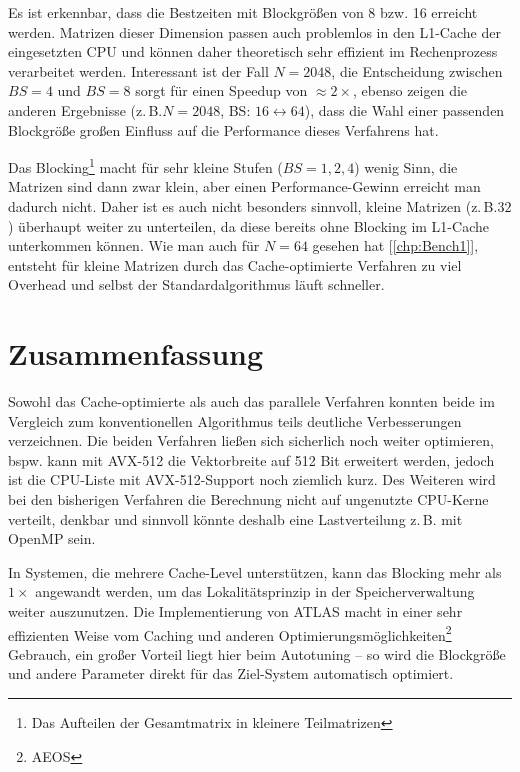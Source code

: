 \documentclass[a4paper,11pt]{scrartcl}
\newcommand{\zB}{\mbox{z.\,B.}\xspace}
\newcommand{\bspw}{\mbox{bspw.}\xspace}
\newcommand{\bzw}{\mbox{bzw.}\xspace}
\begin{document}
Es ist erkennbar, dass die Bestzeiten mit Blockgrößen von 8 \bzw 16 erreicht werden.
Matrizen dieser Dimension passen auch problemlos in den L1-Cache der eingesetzten CPU
und können daher theoretisch sehr effizient im Rechenprozess verarbeitet werden.
Interessant ist der Fall $N=2048$, die Entscheidung zwischen $BS=4$ und $BS=8$
sorgt für einen Speedup von $\approx 2\times$, ebenso zeigen die anderen
Ergebnisse (\zB $N=2048$, BS: $16 \leftrightarrow 64$), dass die Wahl einer
passenden Blockgröße großen Einfluss auf die Performance dieses Verfahrens hat.
\newline

Das Blocking\footnote{Das Aufteilen der Gesamtmatrix in kleinere Teilmatrizen} macht für
sehr kleine Stufen ($BS=1,2,4$)  wenig Sinn, die Matrizen sind dann zwar klein, aber
einen Performance-Gewinn erreicht man dadurch nicht. Daher ist es auch nicht besonders sinnvoll,
kleine Matrizen (\zB $32$) überhaupt weiter zu unterteilen, da diese bereits ohne Blocking
im L1-Cache unterkommen können. Wie man auch für $N=64$ gesehen hat [\ref{chp:Bench1}], 
entsteht für kleine 
Matrizen durch das Cache-optimierte Verfahren zu viel Overhead und selbst der
Standardalgorithmus läuft schneller.

\section{Zusammenfassung}
Sowohl das Cache-optimierte als auch das parallele Verfahren konnten beide
im Vergleich zum konventionellen Algorithmus teils deutliche Verbesserungen verzeichnen.
Die beiden Verfahren ließen sich sicherlich noch weiter optimieren, \bspw
kann mit AVX-512 die Vektorbreite auf 512 Bit erweitert werden, jedoch ist die
CPU-Liste mit AVX-512-Support noch ziemlich kurz. Des Weiteren wird bei den bisherigen Verfahren
die Berechnung nicht auf ungenutzte CPU-Kerne verteilt, denkbar und sinnvoll könnte
deshalb eine Lastverteilung \zB mit OpenMP sein.\newline
 
In Systemen, die mehrere Cache-Level unterstützen, kann das Blocking mehr als $1\times$ angewandt werden,
um das Lokalitätsprinzip in der Speicherverwaltung weiter auszunutzen.
Die Implementierung von ATLAS macht in einer sehr effizienten Weise vom Caching 
und anderen Optimierungsmöglichkeiten\footnote{AEOS} Gebrauch, ein großer Vorteil
liegt hier beim Autotuning -- so wird die Blockgröße und andere Parameter direkt für das 
Ziel-System automatisch optimiert.\newline
\end{document}
